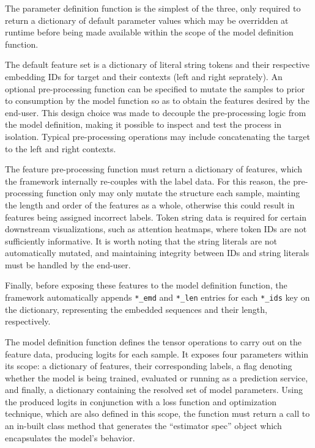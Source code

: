 \documentclass[12pt, a4paper]{report}
\theoremstyle{definition}
\theoremstyle{definition}%
\theoremstyle{definition}%
\theoremstyle{definition}%
\theoremstyle{definition}%
\theoremstyle{definition}%
\begin{document}
The parameter definition function is the simplest of the three, only required to return a dictionary of default parameter values which may be overridden at runtime before being made available within the scope of the model definition function.

The default feature set is a dictionary of literal string tokens and their respective embedding IDs for target and their contexts (left and right seprately). An optional pre-processing function can be specified to mutate the samples to prior to consumption by the model function so as to obtain the features desired by the end-user. This design choice was made to decouple the pre-processing logic from the model definition, making it possible to inspect and test the process in isolation. Typical pre-processing operations may include concatenating the target to the left and right contexts. 

The feature pre-processing function must return a dictionary of features, which the framework internally re-couples with the label data. For this reason, the pre-processing function only may only mutate the structure each sample, mainting the length and order of the features as a whole, otherwise this could result in features being assigned incorrect labels. Token string data is required for certain downstream visualizations, such as attention heatmaps, where token IDs are not sufficiently informative. It is worth noting that the string literals are not automatically mutated, and maintaining integrity between IDs and string literals must be handled by the end-user. 

Finally, before exposing these features to the model definition function, the framework automatically appends \texttt{*\_emd} and \texttt{*\_len} entries for each \texttt{*\_ids} key on the dictionary, representing the embedded sequences and their length, respectively.

The model definition function defines the tensor operations to carry out on the feature data, producing logits for each sample. It exposes four parameters within its scope: a dictionary of features, their corresponding labels, a flag denoting whether the model is being trained, evaluated or running as a prediction service, and finally, a dictionary containing the resolved set of model parameters. Using the produced logits in conjunction with a loss function and optimization technique, which are also defined in this scope, the function must return a call to an in-built class method that generates the \enquote{estimator spec} object which encapsulates the model's behavior. 
\end{document}
